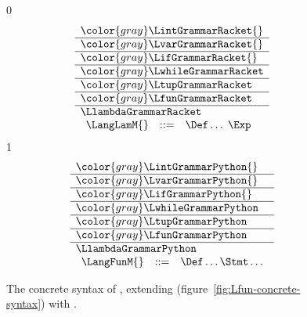 \documentclass[7x10]{TimesAPriori_MIT}%
\newcommand{\gray}[1]{{\color{gray} #1}}
\def\racketEd{0}
\def\pythonEd{1}
\def\edition{1}
\newcommand{\pythonColor}[0]{}
\numberwithin{theorem}{chapter}
\numberwithin{definition}{chapter}
\numberwithin{equation}{chapter}
\begin{document}
\begin{figure}[tp]
\centering
\begin{tcolorbox}[colback=white]
    \small
{\if\edition\racketEd
\[
\begin{array}{l}
  \gray{\LintGrammarRacket{}} \\ \hline
  \gray{\LvarGrammarRacket{}} \\ \hline
  \gray{\LifGrammarRacket{}} \\ \hline
  \gray{\LwhileGrammarRacket} \\ \hline
  \gray{\LtupGrammarRacket} \\   \hline
  \gray{\LfunGrammarRacket} \\   \hline
  \LlambdaGrammarRacket \\
  \begin{array}{lcl}
  \LangLamM{} &::=& \Def\ldots \; \Exp
  \end{array}
\end{array}
\]
\fi}
{\if\edition\pythonEd\pythonColor
\[
\begin{array}{l}
  \gray{\LintGrammarPython{}} \\ \hline
  \gray{\LvarGrammarPython{}} \\ \hline
  \gray{\LifGrammarPython{}} \\ \hline
  \gray{\LwhileGrammarPython} \\ \hline
  \gray{\LtupGrammarPython} \\   \hline
  \gray{\LfunGrammarPython} \\   \hline
  \LlambdaGrammarPython \\
  \begin{array}{lcl}
    \LangFunM{} &::=& \Def\ldots \Stmt\ldots
  \end{array}
\end{array}
\]
\fi}
\end{tcolorbox}
\caption{The concrete syntax of \LangLam{}, extending \LangFun{} (figure~\ref{fig:Lfun-concrete-syntax}) 
  with .}
\label{fig:Llam-concrete-syntax}
\end{figure}
\end{document}
